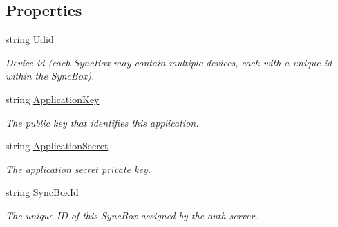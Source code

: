 \subsection*{Properties}
\begin{DoxyCompactItemize}
\item 
string \hyperlink{interface_cloud_api_public_1_1_interfaces_1_1_i_http_settings_a7f318613a1276ec8f27adaa79e097f5d}{Udid}
\begin{DoxyCompactList}\small\item\em Device id (each Sync\-Box may contain multiple devices, each with a unique id within the Sync\-Box). \end{DoxyCompactList}\item 
string \hyperlink{interface_cloud_api_public_1_1_interfaces_1_1_i_http_settings_a9f4bbb5d5cf32d4748895959391f2489}{Application\-Key}
\begin{DoxyCompactList}\small\item\em The public key that identifies this application. \end{DoxyCompactList}\item 
string \hyperlink{interface_cloud_api_public_1_1_interfaces_1_1_i_http_settings_abe14987cd96d35ec040ca3dff7bd9089}{Application\-Secret}
\begin{DoxyCompactList}\small\item\em The application secret private key. \end{DoxyCompactList}\item 
string \hyperlink{interface_cloud_api_public_1_1_interfaces_1_1_i_http_settings_ae02fbf7f1311292d14135095a63b398d}{Sync\-Box\-Id}
\begin{DoxyCompactList}\small\item\em The unique I\-D of this Sync\-Box assigned by the auth server. \end{DoxyCompactList}\end{DoxyCompactItemize}


